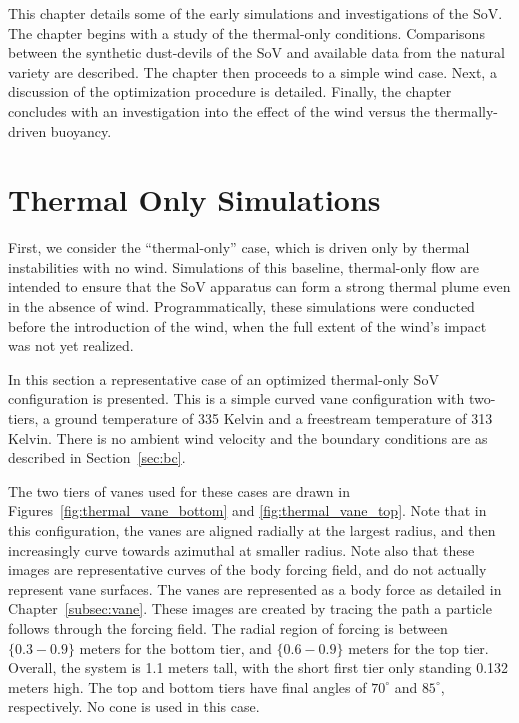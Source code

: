\label{sec:results}

%
%
%
%

This chapter details some of the early simulations and investigations
of the SoV. The chapter begins with a study of the thermal-only
conditions. Comparisons between the synthetic dust-devils of the SoV and
available data from the natural variety are described. The chapter then
proceeds to a simple wind case. Next, a discussion of the optimization
procedure is detailed. Finally, the chapter concludes with an
investigation into the effect of the wind versus the thermally-driven buoyancy. 


\section{Thermal Only Simulations}
\label{sec:thermal_only}


First, we consider the ``thermal-only'' case, which is 
driven only by thermal instabilities with no wind. 
Simulations of this baseline, thermal-only flow are 
intended to ensure that the SoV apparatus can
form a strong thermal plume even in the absence of
wind. Programmatically, these simulations were conducted before the
introduction of the wind, when the full extent of the wind's impact was
not yet realized. 

In this section a representative case of an optimized thermal-only SoV
configuration is presented. This is a simple curved vane configuration with
two-tiers, a ground temperature of 335 Kelvin and a freestream
temperature of 313 Kelvin. There is no ambient wind velocity and the boundary
conditions are as described in Section~\ref{sec:bc}.  

The two tiers of vanes used for these cases are drawn in
Figures~\ref{fig:thermal_vane_bottom} and \ref{fig:thermal_vane_top}.  
Note that in this configuration, the vanes are aligned radially at the
largest radius, and then increasingly curve towards azimuthal at smaller
radius. Note also that these images are representative curves of the
body forcing field, and do not actually represent vane surfaces. The
vanes are represented as a body force as detailed in
Chapter~\ref{subsec:vane}. These images are created by tracing the path
a particle follows through the forcing field. The 
radial region of forcing is between $\{0.3-0.9\}$ meters for the bottom tier,
and $\{0.6-0.9\}$ meters for the top tier. Overall, the system is 1.1
meters tall, with the short first tier only standing 0.132 meters
high. The top and bottom tiers have final angles of $70^{\circ}$ and
$85^{\circ}$, respectively. No cone is used in this case. 

